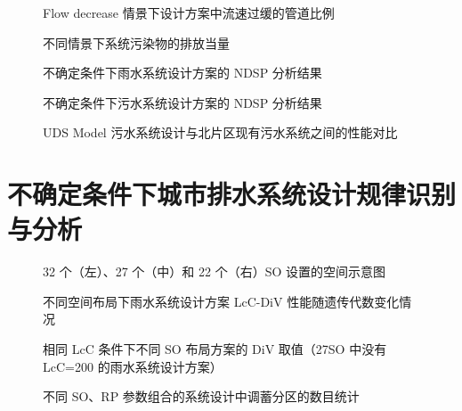 \documentclass[degree=doctor]{sysuthesis}
\begin{document}
\clearpage
\setcounter{page}{133}
\begin{figure}
  \centering
  \caption{Flow decrease 情景下设计方案中流速过缓的管道比例}
\end{figure}

\clearpage
\setcounter{page}{134}
\begin{figure}
  \centering
  \caption{不同情景下系统污染物的排放当量}
\end{figure}

\clearpage
\setcounter{page}{135}
\begin{figure}
  \centering
  \caption{不确定条件下雨水系统设计方案的 NDSP 分析结果}
\end{figure}

\clearpage
\setcounter{page}{137}
\begin{figure}
  \centering
  \caption{不确定条件下污水系统设计方案的 NDSP 分析结果}
\end{figure}

\clearpage
\setcounter{page}{139}
\begin{figure}
  \centering
  \caption{UDS Model 污水系统设计与北片区现有污水系统之间的性能对比}
\end{figure}


\chapter{不确定条件下城市排水系统设计规律识别与分析}

\clearpage
\setcounter{page}{141}
\begin{figure}
  \centering
  \caption{32 个（左）、27 个（中）和 22 个（右）SO 设置的空间示意图}
\end{figure}

\clearpage
\setcounter{page}{142}
\begin{figure}
  \centering
  \caption{不同空间布局下雨水系统设计方案 LcC-DiV 性能随遗传代数变化情况}
\end{figure}

\clearpage
\setcounter{page}{143}
\begin{figure}
  \centering
  \caption{相同 LcC 条件下不同 SO 布局方案的 DiV 取值（27SO 中没有 LcC=200 的雨水系统设计方案）}
\end{figure}

\clearpage
\setcounter{page}{145}
\begin{figure}
  \centering
  \caption{不同 SO、RP 参数组合的系统设计中调蓄分区的数目统计}
\end{figure}
\end{document}
